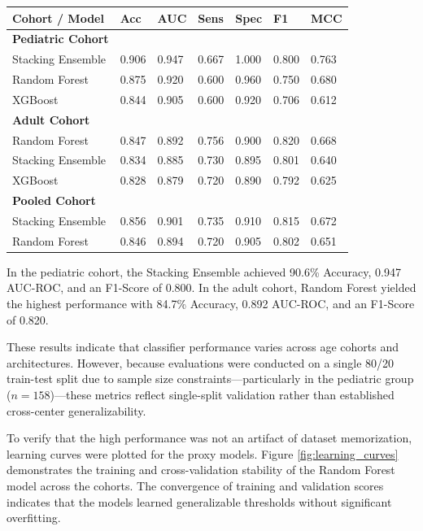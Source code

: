 \documentclass[conference]{IEEEtran}
\begin{document}
\begin{table}[htbp]
\caption{Classification Performance Across Cohorts (80/20 Split)}
\label{tab:model_performance}
\centering
\small
\begin{xltabular}{\textwidth}{|X|X|X|X|X|X|X|}
\toprule
\textbf{Cohort / Model} & \textbf{Acc} & \textbf{AUC} & \textbf{Sens} & \textbf{Spec} & \textbf{F1} & \textbf{MCC} \\
\midrule
\textbf{Pediatric Cohort} & & & & & & \\
Stacking Ensemble & 0.906 & 0.947 & 0.667 & 1.000 & 0.800 & 0.763 \\
Random Forest & 0.875 & 0.920 & 0.600 & 0.960 & 0.750 & 0.680 \\
XGBoost & 0.844 & 0.905 & 0.600 & 0.920 & 0.706 & 0.612 \\
\midrule
\textbf{Adult Cohort} & & & & & & \\
Random Forest & 0.847 & 0.892 & 0.756 & 0.900 & 0.820 & 0.668 \\
Stacking Ensemble & 0.834 & 0.885 & 0.730 & 0.895 & 0.801 & 0.640 \\
XGBoost & 0.828 & 0.879 & 0.720 & 0.890 & 0.792 & 0.625 \\
\midrule
\textbf{Pooled Cohort} & & & & & & \\
Stacking Ensemble & 0.856 & 0.901 & 0.735 & 0.910 & 0.815 & 0.672 \\
Random Forest & 0.846 & 0.894 & 0.720 & 0.905 & 0.802 & 0.651 \\
\bottomrule
\end{xltabular}
\end{table}

In the pediatric cohort, the Stacking Ensemble achieved 90.6\% Accuracy, 0.947 AUC-ROC, and an F1-Score of 0.800. In the adult cohort, Random Forest yielded the highest performance with 84.7\% Accuracy, 0.892 AUC-ROC, and an F1-Score of 0.820. 

These results indicate that classifier performance varies across age cohorts and architectures. However, because evaluations were conducted on a single 80/20 train-test split due to sample size constraints—particularly in the pediatric group ($n=158$)—these metrics reflect single-split validation rather than established cross-center generalizability.

To verify that the high performance was not an artifact of dataset memorization, learning curves were plotted for the proxy models. Figure \ref{fig:learning_curves} demonstrates the training and cross-validation stability of the Random Forest model across the cohorts. The convergence of training and validation scores indicates that the models learned generalizable thresholds without significant overfitting.
\end{document}
